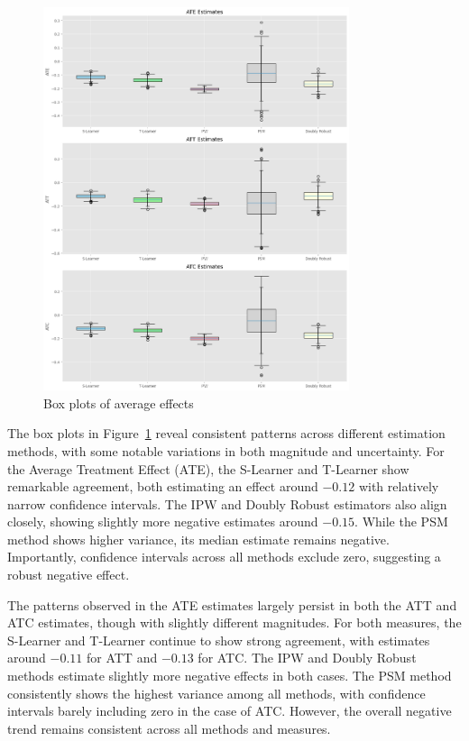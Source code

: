 \documentclass{article}
\begin{document}
\begin{figure}[h!]
    \centering
    \caption{Box plots of average effects}
    \label{fig:box_plots}
    \includegraphics[width = 0.8\textwidth]{plots/box_plots.png}
\end{figure}

The box plots in Figure~\ref{fig:box_plots} reveal consistent patterns across different estimation methods, with some notable variations in both magnitude and uncertainty. For the Average Treatment Effect (ATE), the S-Learner and T-Learner show remarkable agreement, both estimating an effect around $-0.12$ with relatively narrow confidence intervals. The IPW and Doubly Robust estimators also align closely, showing slightly more negative estimates around $-0.15$. While the PSM method shows higher variance, its median estimate remains negative. Importantly, confidence intervals across all methods exclude zero, suggesting a robust negative effect.

The patterns observed in the ATE estimates largely persist in both the ATT and ATC estimates, though with slightly different magnitudes. For both measures, the S-Learner and T-Learner continue to show strong agreement, with estimates around $-0.11$ for ATT and $-0.13$ for ATC. The IPW and Doubly Robust methods estimate slightly more negative effects in both cases. The PSM method consistently shows the highest variance among all methods, with confidence intervals barely including zero in the case of ATC. However, the overall negative trend remains consistent across all methods and measures.
\end{document}
